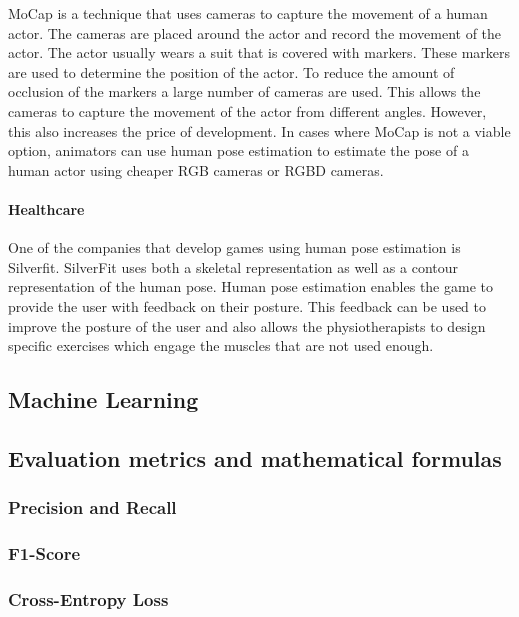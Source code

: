 MoCap is a technique that uses cameras to capture the movement of a human actor. The cameras are placed around the actor and record the movement of the actor. The actor usually wears a suit that is covered with markers. These markers are used to determine the position of the actor. To reduce the amount of occlusion of the markers a large number of cameras are used. This allows the cameras to capture the movement of the actor from different angles. However, this also increases the price of development. In cases where MoCap is not a viable option, animators can use human pose estimation to estimate the pose of a human actor using cheaper RGB cameras or RGBD cameras.

\paragraph{Healthcare}

One of the companies that develop games using human pose estimation is Silverfit. SilverFit uses both a skeletal representation as well as a contour representation of the human pose. Human pose estimation enables the game to provide the user with feedback on their posture. This feedback can be used to improve the posture of the user and also allows the physiotherapists to design specific exercises which engage the muscles that are not used enough.

\subsection{Machine Learning}

\subsection{Evaluation metrics and mathematical formulas}

\subsubsection{Precision and Recall}

\subsubsection{F1-Score}

\subsubsection{Cross-Entropy Loss}